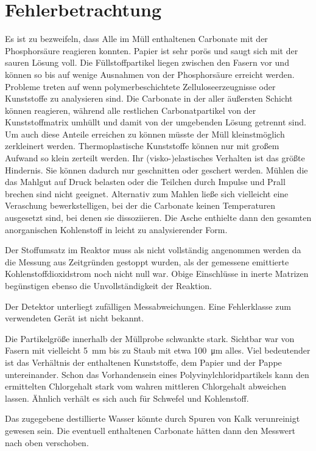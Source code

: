 \chapter{Fehlerbetrachtung}

Es ist zu bezweifeln, dass Alle im Müll enthaltenen Carbonate mit der Phosphorsäure reagieren konnten. Papier ist sehr porös und saugt sich mit der sauren Lösung voll. Die Füllstoffpartikel liegen zwischen den Fasern vor und können so bis auf wenige Ausnahmen von der Phosphorsäure erreicht werden. Probleme treten auf wenn polymerbeschichtete Zelluloseerzeugnisse oder Kunststoffe zu analysieren sind. Die Carbonate in der aller äußersten Schicht können reagieren, während alle restlichen Carbonatpartikel von der Kunststoffmatrix umhüllt und damit von der umgebenden Lösung getrennt sind. Um auch diese Anteile erreichen zu können müsste der Müll kleinstmöglich zerkleinert werden. Thermoplastische Kunststoffe können nur mit großem Aufwand so klein zerteilt werden. Ihr (visko-)elastisches Verhalten ist das größte Hindernis. Sie können dadurch nur geschnitten oder geschert werden. Mühlen die das Mahlgut auf Druck belasten oder die Teilchen durch Impulse und Prall brechen sind nicht geeignet.
Alternativ zum Mahlen ließe sich vielleicht eine Veraschung bewerkstelligen, bei der die Carbonate keinen Temperaturen ausgesetzt sind, bei denen sie dissoziieren. Die Asche enthielte dann den gesamten anorganischen Kohlenstoff in leicht zu analysierender Form.

Der Stoffumsatz im Reaktor muss als nicht vollständig angenommen werden da die Messung aus Zeitgründen gestoppt wurden, als der gemessene emittierte Kohlenstoffdioxidstrom noch nicht null war. Obige Einschlüsse in inerte Matrizen begünstigen ebenso die Unvollständigkeit der Reaktion. 



Der Detektor unterliegt zufälligen Messabweichungen. Eine Fehlerklasse zum verwendeten Gerät ist nicht bekannt. 

Die Partikelgröße innerhalb der Müllprobe schwankte stark. Sichtbar war von Fasern mit vielleicht \SI{5}{\milli\meter} bis zu Staub mit etwa \SI{100}{\micro\meter} alles. Viel bedeutender ist das Verhältnis der enthaltenen Kunststoffe, dem Papier und der Pappe untereinander. Schon das Vorhandensein eines Polyvinylchloridpartikels kann den ermittelten Chlorgehalt stark vom wahren mittleren Chlorgehalt abweichen lassen.
Ähnlich verhält es sich auch für Schwefel und Kohlenstoff.


Das zugegebene destillierte Wasser könnte durch Spuren von Kalk verunreinigt gewesen sein. Die eventuell enthaltenen Carbonate hätten dann den Messwert nach oben verschoben.


